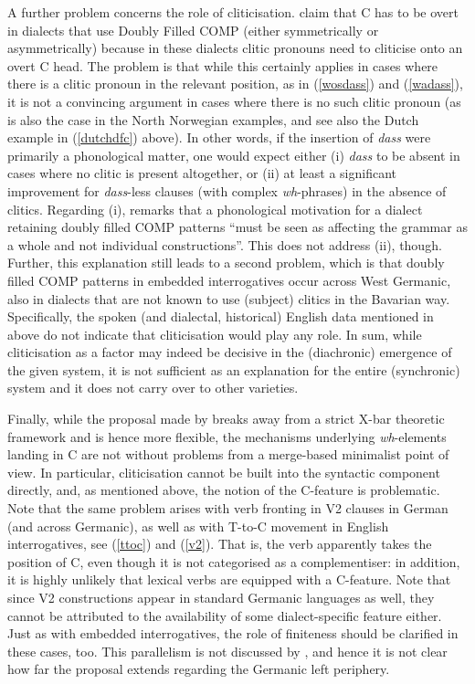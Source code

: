 A further problem concerns the role of cliticisation. \citet{bayerbrandner2008} claim that C has to be overt in dialects that use Doubly Filled COMP (either symmetrically or asymmetrically) because in these dialects clitic pronouns need to cliticise onto an overt C head. The problem is that while this certainly applies in cases where there is a clitic pronoun in the relevant position, as in (\ref{wosdass}) and (\ref{wadass}), it is not a convincing argument in cases where there is no such clitic pronoun (as is also the case in the North Norwegian examples, and see also the Dutch example in (\ref{dutchdfc}) above). In other words, if the insertion of \textit{dass} were primarily a phonological matter, one would expect either (i) \textit{dass} to be absent in cases where no clitic is present altogether, or (ii) at least a significant improvement for \textit{dass}-less clauses (with complex \textit{wh}-phrases) in the absence of clitics. Regarding (i), \citet[41]{bayer2014} remarks that a phonological motivation for a dialect retaining doubly filled COMP patterns ``must be seen as affecting the grammar as a whole and not individual constructions''. This does not address (ii), though. Further, this explanation still leads to a second problem, which is that doubly filled COMP patterns in embedded interrogatives occur across West Germanic, also in dialects that are not known to use (subject) clitics in the Bavarian way. Specifically, the spoken (and dialectal, historical) English data mentioned in  above do not indicate that cliticisation would play any role. In sum, while cliticisation as a factor may indeed be decisive in the (diachronic) emergence of the given system, it is not sufficient as an explanation for the entire (synchronic) system and it does not carry over to other varieties.

Finally, while the proposal made by \citet{bayerbrandner2008} breaks away from a strict X-bar theoretic framework and is hence more flexible, the mechanisms underlying \textit{wh}-elements landing in C are not without problems from a merge-based minimalist point of view. In particular, cliticisation cannot be built into the syntactic component directly, and, as mentioned above, the notion of the C-feature is problematic. Note that the same problem arises with verb fronting in V2 clauses in German (and across Germanic), as well as with T-to-C movement in English interrogatives, see (\ref{ttoc}) and (\ref{v2}). That is, the verb apparently takes the position of C, even though it is not categorised as a complementiser: in addition, it is highly unlikely that lexical verbs are equipped with a C-feature. Note that since V2 constructions appear in standard Germanic languages as well, they cannot be attributed to the availability of some dialect-specific feature either. Just as with embedded interrogatives, the role of finiteness should be clarified in these cases, too. This parallelism is not discussed by \citet{bayerbrandner2008}, and hence it is not clear how far the proposal extends regarding the Germanic left periphery.

